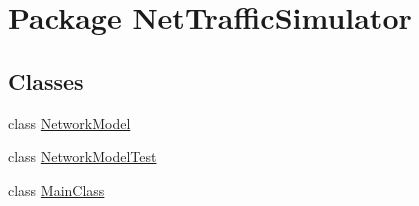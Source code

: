 \hypertarget{namespaceNetTrafficSimulator}{\section{Package Net\-Traffic\-Simulator}
\label{namespaceNetTrafficSimulator}
}
\subsection*{Classes}
\begin{DoxyCompactItemize}
\item 
class \hyperlink{classNetTrafficSimulator_1_1NetworkModel}{Network\-Model}
\item 
class \hyperlink{classNetTrafficSimulator_1_1NetworkModelTest}{Network\-Model\-Test}
\item 
class \hyperlink{classNetTrafficSimulator_1_1MainClass}{Main\-Class}
\end{DoxyCompactItemize}
